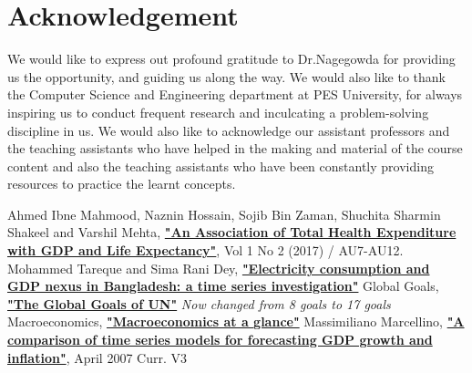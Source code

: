 \documentclass[conference]{IEEEtran}
\begin{document}
\section{Acknowledgement}
We would like to express out profound gratitude to Dr.Nagegowda for providing us the opportunity, and guiding us along the way.
We would also like to thank the Computer Science and Engineering department at PES University, for always inspiring us to conduct frequent research and inculcating a problem-solving discipline in us.
We would also like to acknowledge our assistant professors and the teaching assistants who have helped in the making and material of the course content and also the teaching assistants who have been constantly providing resources to practice the learnt concepts.
\begin{thebibliography}{00}
     Ahmed Ibne Mahmood, Naznin Hossain, Sojib Bin Zaman,  Shuchita Sharmin Shakeel and Varshil Mehta,  \textbf{\href{https://jmrionline.com/jmri/article/view/72/86}{"An Association of Total Health Expenditure with GDP and Life Expectancy"}}, Vol 1 No 2 (2017) / AU7-AU12.
     Mohammed Tareque and Sima Rani Dey, \textbf{\href{https://www.emerald.com/insight/content/doi/10.1108/JABES-04-2019-0029/full/pdf}{"Electricity consumption and GDP nexus in Bangladesh: a time series investigation"}}
     Global Goals, \textbf{\href{https://www.globalgoals.org/goals/}{"The Global Goals of UN"}} \emph{Now changed from 8 goals to 17 goals}
     Macroeconomics, \textbf{\href{https://www.worldbank.org/en/topic/macroeconomics/overview}{"Macroeconomics at a glance"}}
     Massimiliano Marcellino, \textbf{\href{https://www.researchgate.net/profile/Niels-Haldrup/publication/228650389_A_comparison_of_time_series_models_for_forecasting_GDP_growth_and_inflation/links/0c96051b6b0d0e7951000000/A-comparison-of-time-series-models-for-forecasting-GDP-growth-and-inflation.pdf}{"A comparison of time series models for forecasting GDP growth and inflation"}}, April 2007 Curr. V3
\end{thebibliography}
\end{document}
